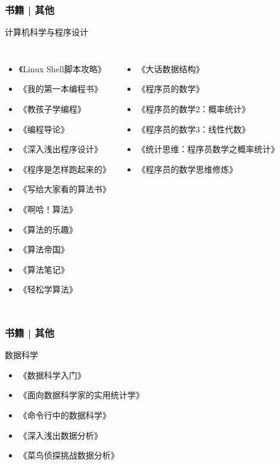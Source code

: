 \begin{frame}
  \frametitle{书籍 | 其他}
  \begin{block}{计算机科学与程序设计}
    \begin{columns}
    \begin{itemize}
      \item 《Linux Shell脚本攻略》
      \item 《我的第一本编程书》
      \item 《教孩子学编程》
      \item 《编程导论》
      \item 《深入浅出程序设计》
      \item 《程序是怎样跑起来的》
      \item 《写给大家看的算法书》
      \item 《啊哈！算法》
      \item 《算法的乐趣》
      \item 《算法帝国》
      \item 《算法笔记》
      \item 《轻松学算法》
    \end{itemize}
    \begin{itemize}
      \item 《大话数据结构》
      \item 《程序员的数学》
      \item 《程序员的数学2：概率统计》
      \item 《程序员的数学3：线性代数》
      \item 《统计思维：程序员数学之概率统计》
      \item 《程序员的数学思维修炼》
    \end{itemize}
  \end{columns}
  \end{block}
\end{frame}

\begin{frame}
  \frametitle{书籍 | 其他}
    \begin{block}{数据科学}
      \begin{itemize}
        \item 《数据科学入门》
        \item 《面向数据科学家的实用统计学》
        \item 《命令行中的数据科学》
        \item 《深入浅出数据分析》
        \item 《菜鸟侦探挑战数据分析》
      \end{itemize}
  \end{block}
\end{frame}

